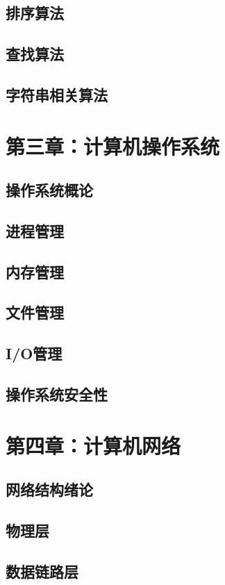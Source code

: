 \documentclass[UTF8]{book}
\begin{document}
        \section{排序算法}
        \section{查找算法}
        \section{字符串相关算法}
    \newpage
    \chapter{第三章：计算机操作系统}
        \section{操作系统概论}
        \section{进程管理}
        \section{内存管理}
        \section{文件管理}
        \section{I/O管理}
        \section{操作系统安全性}

    \newpage
    \chapter{第四章：计算机网络}
        \section{网络结构绪论}
        \section{物理层}
        \section{数据链路层}
\end{document}
